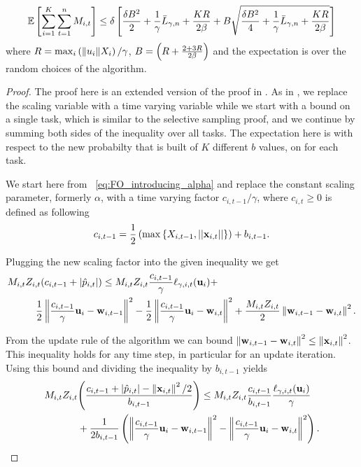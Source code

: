 {\begin{theorem}
\begin{displaymath}
\mathbb{E}\left[{ \sum_{i=1}^{K}\sum_{t=1}^{n}{M_{i,t}}}\right]
\le \delta\left[{\frac{\delta B^2}{2}+\frac{1}{\gamma}{\bar L}_{\gamma,n}+\frac{KR}{2\beta}
+ B\sqrt{\frac{\delta B^2}{4}+\frac{1}{\gamma}{\bar L}_{\gamma,n}+\frac{KR}{2\beta}}}\right]
\end{displaymath}
 where $R = \max_i{\left({\Vert u_i\Vert X_i}\right)/{\gamma}}$, $B=\left({R+\frac{2+3R}{2\beta}}\right)$ and the expectation is over the
random choices of the algorithm.
\end{theorem} \label{thm:adaptive_bound}

 \noindent
 \begin{proof}
The proof here is an extended version of the proof in . As in 
\cite{DBLP:conf/nips/Cesa-BianchiGZ04}, we replace the scaling variable with a 
time varying variable while we start with a bound on a single task, which is similar to the selective sampling
proof, and we continue by summing both sides of the inequality over all tasks. 
The expectation here is with respect to the new probabilty that is built of $K$ 
different $b$ values, on for each task. 

We start here from ~\eqref{eq:FO_introducing_alpha} and replace the constant scaling parameter, 
formerly $\alpha$, with a time varying factor $c_{i,t-1}/\gamma$, where $c_{i,t}\ge0$  is defined as following 
\begin{equation*}
c_{i,t-1}=\frac{1}{2}\left({\max{\left\{{X_{i,t-1},\left\vert{\left\vert{\mathbf{x}_{i,t}}\right\vert}\right\vert}\right\}}}\right)+b_{i,t-1}.
\end{equation*}

\noindent
Plugging the new scaling factor into the 
given inequality we get 
\begin{equation*}
\begin{split}
M_{i,t}Z_{i,t}{\left({c_{i,t-1} +\left\vert{\hat{p}_{i,t}}\right\vert}\right)} \le M_{i,t}&Z_{i,t}\frac{c_{i,t-1}}{\gamma} \ell_{\gamma,i,t}(\mathbf{u}_i)+\\ 
\frac{1}{2}\left\Vert {\frac{c_{i,t-1}}{\gamma} \mathbf{u}_i-\mathbf{w}_{i,t-1}} \right\Vert^2&-\frac{1}{2}\left\Vert {\frac{c_{i,t-1}}{\gamma} \mathbf{u}_i-\mathbf{w}_{i,t}} \right\Vert^2+
\frac{M_{i,t}Z_{i,t}}{2}\left\Vert {\mathbf{w}_{i,t-1}-\mathbf{w}_{i,t}} \right\Vert^2.
\end{split}
\end{equation*}

\noindent
From the update rule of the  algorithm we can bound $\left\Vert {\mathbf{w}_{i,t-1}-\mathbf{w}_{i,t}} \right\Vert^2\le \left\Vert {\mathbf{x}_{i,t}} \right\Vert^2$. 
This inequality holds for any time step, in particular for an update iteration. 
Using this bound and dividing the inequality by  $b_{i,t-1}$ yields
\begin{equation}
\begin{split}
M_{i,t}Z_{i,t}&{\left({\frac{c_{i,t-1} +\left\vert{\hat{p}_{i,t}}\right\vert-\left\Vert {\mathbf{x}_{i,t}} \right\Vert^2/2}{b_{i,t-1}}}\right)} \le M_{i,t}Z_{i,t}\frac{c_{i,t-1}}{b_{i,t-1}}\frac{\ell_{\gamma,i,t}(\mathbf{u}_i)}{\gamma} \\ 
&+\frac{1}{2b_{i,t-1
}}\left({\left\Vert {\frac{c_{i,t-1}}{\gamma} \mathbf{u}_i-\mathbf{w}_{i,t-1}} \right\Vert^2-\left\Vert {\frac{c_{i,t-1}}{\gamma} \mathbf{u}_i-\mathbf{w}_{i,t}} \right\Vert^2}\right).
\label{eq:AD_first_step}
\end{split}
\end{equation}


\end{proof}}
